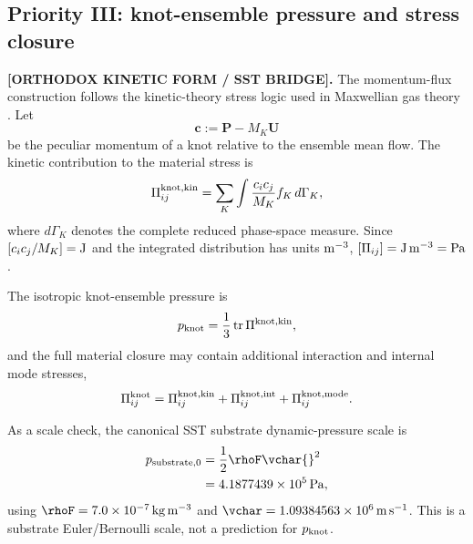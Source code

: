 \subsection{Priority III: knot-ensemble pressure and stress closure}
    \label{subsec:rt_maxwell_knot_stress}

\textbf{[ORTHODOX KINETIC FORM / SST BRIDGE].}
The momentum-flux construction follows the kinetic-theory stress logic used in Maxwellian gas theory \cite{Maxwell1860GasesI}.
Let
\begin{equation}
    \mathbf c
    :=
    \mathbf P-M_K\mathbf U
    \label{eq:rt_maxwell_peculiar_momentum}
\end{equation}
be the peculiar momentum of a knot relative to the ensemble mean flow.  The
kinetic contribution to the material stress is
\begin{equation}
    \Pi_{ij}^{\rm knot,kin}
    =
    \sum_K
    \int
    \frac{c_i c_j}{M_K}
    f_K\,d\Gamma_K,
    \label{eq:rt_maxwell_knot_stress_tensor}
\end{equation}
where $d\Gamma_K$ denotes the complete reduced phase-space measure.  Since
$[c_i c_j/M_K]={\rm J}$ and the integrated distribution has units
${\rm m^{-3}}$, $[\Pi_{ij}]={\rm J\,m^{-3}}={\rm Pa}$.

The isotropic knot-ensemble pressure is
\begin{equation}
    p_{\rm knot}
    =
    \frac13
    \operatorname{tr}
    \Pi^{\rm knot,kin},
    \label{eq:rt_maxwell_knot_pressure}
\end{equation}
and the full material closure may contain additional interaction and internal
mode stresses,
\begin{equation}
    \Pi_{ij}^{\rm knot}
    =
    \Pi_{ij}^{\rm knot,kin}
    +
    \Pi_{ij}^{\rm knot,int}
    +
    \Pi_{ij}^{\rm knot,mode}.
    \label{eq:rt_maxwell_full_knot_stress}
\end{equation}

As a scale check, the canonical SST substrate dynamic-pressure scale is
\begin{align}
    p_{\rm substrate,0}
    &=
    \frac12\rhoF\vchar{}^2\nonumber\\
    &=
    4.1877439\times10^5\,\mathrm{Pa},
    \label{eq:rt_maxwell_substrate_pressure_scale}
\end{align}
using $\rhoF=7.0\times10^{-7}\,\mathrm{kg\,m^{-3}}$ and
$\vchar=1.09384563\times10^6\,\mathrm{m\,s^{-1}}$.  This is a
substrate Euler/Bernoulli scale, not a prediction for $p_{\rm knot}$.

